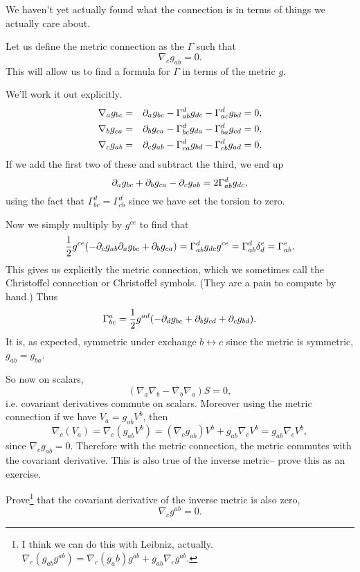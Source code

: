 We haven't yet actually found what the connection is in terms of things we actually care about. 
\begin{defn}
Let us define the metric connection as the $\Gamma$ such that
$$\nabla_c g_{ab}=0.$$
This will allow us to find a formula for $\Gamma$ in terms of the metric $g$.
\end{defn}

We'll work it out explicitly.
\begin{eqnarray*}
\nabla_a g_{bc}&=&\partial_a g_{bc}-\Gamma^d_{ab}g_{dc}-\Gamma^d_{ac}g_{bd}=0,\\
\nabla_b g_{ca}&=&\partial_b g_{ca}-\Gamma^d_{bc} g_{da} - \Gamma^d_{ba}g_{cd}=0,\\
\nabla_c g_{ab}&=&\partial_c g_{ab}-\Gamma^d_{ca} g_{bd}-\Gamma^d_{cb}g_{ad}=0.
\end{eqnarray*}
If we add the first two of these and subtract the third, we end up
$$\partial_a g_{bc}+\partial_b g_{ca} - \partial_c g_{ab} = 2\Gamma^d_{ab} g_{dc},$$
using the fact that $\Gamma^d_{bc}=\Gamma^d_{cb}$ since we have set the torsion to zero.

Now we simply multiply by $g^{ce}$ to find that
$$\frac{1}{2}g^{ce}(-\partial_c g_{ab} \partial_a g_{bc} +\partial_b g_{ca})=\Gamma^d_{ab} g_{dc} g^{ce} =\Gamma^d_{ab} \delta^e_d = \Gamma^e_{ab}.$$
This gives us explicitly the metric connection, which we sometimes call the Christoffel connection or Christoffel symbols. (They are a pain to compute by hand.) Thus
$$\Gamma^a_{bc}=\frac{1}{2} g^{ad}(-\partial_d g_{bc}+\partial_b g_{cd} + \partial_c g_{bd}).$$
It is, as expected, symmetric under exchange $b\leftrightarrow c$ since the metric is symmetric, $g_{ab}=g_{ba}$.

So now on scalars,
$$(\nabla_a \nabla_b -\nabla_b \nabla_a)S=0,$$
i.e. covariant derivatives commute on scalars. Moreover using the metric connection if we have $V_a =g_{ab} V^b$, then
$$\nabla_c(V_a)=\nabla_c (g_{ab} V^b)=(\nabla_c g_{ab}) V^b+ g_{ab}\nabla_c V^b= g_{ab}\nabla_c V^b,$$
since $\nabla_c g_{ab}=0$. Therefore with the metric connection, the metric commutes with the covariant derivative. This is also true of the inverse metric-- prove this as an exercise.

\begin{ex}
Prove\footnote{I think we can do this with Leibniz, actually. $\nabla_c(g_{ab}g^{ab})=\nabla_c(g_ab) g^{ab}+g_{ab} \nabla_c g^{ab}$.} that the covariant derivative of the inverse metric is also zero,
$$\nabla_c g^{ab}=0.$$
\end{ex}